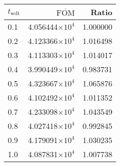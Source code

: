 \begin{tabular}{lrr}
\toprule
$t_{\mathrm{wdt}}$ & $\overline{\mathrm{FOM}}$ &    Ratio \\
\midrule
               0.1 &   4.056444$\times 10^{4}$ & 1.000000 \\
               0.2 &   4.123366$\times 10^{4}$ & 1.016498 \\
               0.3 &   4.113303$\times 10^{4}$ & 1.014017 \\
               0.4 &   3.990449$\times 10^{4}$ & 0.983731 \\
               0.5 &   4.323667$\times 10^{4}$ & 1.065876 \\
               0.6 &   4.102492$\times 10^{4}$ & 1.011352 \\
               0.7 &   4.233098$\times 10^{4}$ & 1.043549 \\
               0.8 &   4.027418$\times 10^{4}$ & 0.992845 \\
               0.9 &   4.179091$\times 10^{4}$ & 1.030235 \\
               1.0 &   4.087831$\times 10^{4}$ & 1.007738 \\
\bottomrule
\end{tabular}
